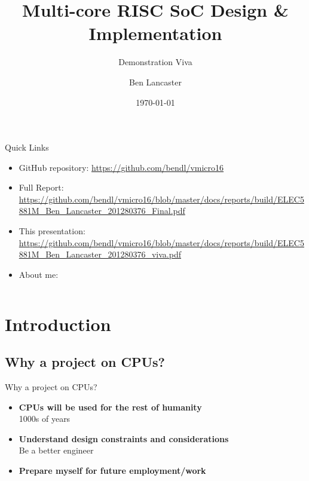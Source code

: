 \documentclass[aspectratio=169]{beamer}
\title
    [Main Project]
    {\textbf{Multi-core RISC SoC Design \& Implementation}}
\subtitle{Demonstration Viva}
\author
    [B. Lancaster]
    {Ben Lancaster}
\institute
    [\hypersetup{urlcolor=jdgrey}%
     \href{https://bendl.me/}{https://bendl.me}
    ]
    {201280376\\
    ELEC5881M - Main Project}
\date
    {\today}
\begin{document}
\begin{frame}[plain]
\titlepage
\end{frame}

\begin{frame}{Quick Links}
\begin{itemize}\setlength\itemsep{1em}
    \item GitHub repository: \url{https://github.com/bendl/vmicro16}
    \item Full Report: \url{https://github.com/bendl/vmicro16/blob/master/docs/reports/build/ELEC5881M_Ben_Lancaster_201280376_Final.pdf}
    \item This presentation: \url{https://github.com/bendl/vmicro16/blob/master/docs/reports/build/ELEC5881M_Ben_Lancaster_201280376_viva.pdf}
    \item About me: 
\end{itemize}
\end{frame}

\begin{frame}
\vspace{-1cm}
\begin{columns}[t]
        \begin{column}{.5\textwidth}
            \tableofcontents[sections={1-3}]
        \end{column}
        \begin{column}{.5\textwidth}
            \tableofcontents[sections={4-5}]
        \end{column}
    \end{columns}
\end{frame}

\section{Introduction}
\frame{\vspace{-1cm}\tableofcontents[currentsection, subsectionstyle=show/show/hide]}

\subsection{Why a project on CPUs?}
\begin{frame}{Why a project on CPUs?}
\begin{itemize}\setlength\itemsep{1em}
    \item{\textbf{CPUs will be used for the rest of humanity}\\
    1000s of years}
    \item{\textbf{Understand design constraints and considerations}\\
    Be a better engineer}
    \item{\textbf{Prepare myself for future employment/work}}
\end{itemize}
\end{frame}
\end{document}
